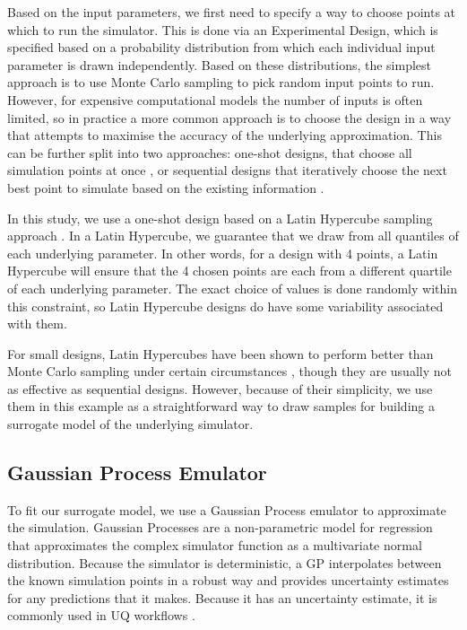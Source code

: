 \documentclass[openacc]{rstransa}%
\begin{document}
\label{experimentaldesign}

Based on the input parameters, we first need to specify a way to choose points at which to run the simulator.
This is done via an Experimental Design, which is specified based on a probability distribution from which
each individual input parameter is drawn independently. Based on these distributions, the simplest approach
is to use Monte Carlo sampling to pick random input points to run. However, for expensive computational
models the number of inputs is often limited, so in practice a more common approach is to choose
the design in a way that attempts to maximise the accuracy of the underlying approximation. This can be
further split into two approaches: one-shot designs, that choose all simulation points at once \cite{lhc},
or sequential designs that iteratively choose the next best point to simulate based on the existing
information \cite{mice}.

In this study, we use a one-shot design based on a Latin Hypercube sampling approach \cite{lhc}. In a Latin
Hypercube, we guarantee that we draw from all quantiles of each underlying parameter. In other words,
for a design with 4 points, a Latin Hypercube will ensure that the 4 chosen points are each from
a different quartile of each underlying parameter. The exact choice of values is done randomly
within this constraint, so Latin Hypercube designs do have some variability associated with them.

For small designs, Latin Hypercubes have been shown to perform better than Monte Carlo sampling under
certain circumstances \cite{lhc}, though they are usually not as effective as sequential designs. However, because
of their simplicity, we use them in this example as a straightforward way to draw samples for
building a surrogate model of the underlying simulator.

\subsection{Gaussian Process Emulator}

To fit our surrogate model, we use a Gaussian Process emulator to approximate the simulation.
Gaussian Processes are a non-parametric model for regression that approximates the complex simulator
function as a multivariate normal distribution. Because the simulator is deterministic,
a GP interpolates between the known simulation points in a robust way and provides uncertainty
estimates for any predictions that it makes. Because it has an uncertainty estimate, it is commonly
used in UQ workflows \cite{calibration,histmatch,mice}.
\end{document}
